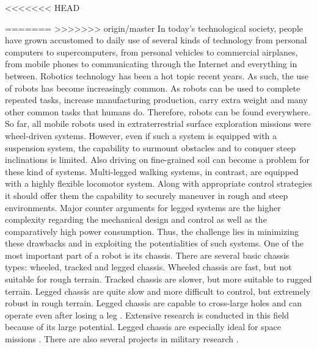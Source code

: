 <<<<<<< HEAD



=======
%
%
%
>>>>>>> origin/master
In today’s technological society, people have grown accustomed to daily use of several kinds of technology from personal computers to supercomputers, from personal vehicles to commercial airplanes, from mobile phones to communicating through the Internet and everything in between. Robotics technology has been a hot topic recent years.  As such, the use of robots has become increasingly common. As robots can be used to complete repeated tasks, increase manufacturing production, carry extra weight and many other common tasks that humans do. Therefore, robots can be found everywhere. 
So far, all mobile robots used in extraterrestrial surface exploration missions were wheel-driven systems. However, even if such a system is equipped with a suspension system, the capability to surmount obstacles and to conquer steep inclinations is limited. Also driving on fine-grained soil can become a problem for these kind of systems. Multi-legged walking systems, in contrast, are equipped with a highly flexible locomotor system. Along with appropriate control strategies it should offer them the capability to securely maneuver in rough and steep environments. Major counter arguments for legged systems are the higher complexity regarding the mechanical design and control as well as the comparatively high power consumption. Thus, the challenge lies in minimizing these drawbacks and in exploiting the potentialities of such systems. 
One of the most important part of a robot is its chassis. There are several basic chassis types: wheeled, tracked and legged chassis. Wheeled chassis are fast, but not suitable for rough terrain. Tracked chassis are slower, but more suitable to rugged terrain. Legged chassis are quite slow and more difficult to control, but extremely robust in rough terrain. Legged chassis are capable to cross-large holes and can operate even after losing a leg \cite{1}. Extensive research is conducted in this field because of its large potential. Legged chassis are especially ideal for space missions \cite{2,3} . There are also several projects in military research \cite{4,5}.
